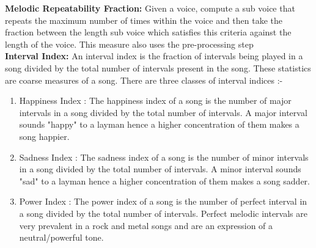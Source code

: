 \noindent \textbf{Melodic Repeatability Fraction: } Given a voice, compute a sub voice that repeats the maximum number of times within the voice and then take the fraction between the length sub voice which satisfies this criteria against the length of the voice. This measure also uses the pre-processing step \\

\noindent \textbf{Interval Index: } An interval index is the fraction of intervals being played in a song divided by the total number of intervals present in the song. These statistics are coarse measures of a song. There are three classes of interval indices :-

\begin{enumerate}
\item Happiness Index : The happiness index of a song is the number of major intervals in a song divided by the total number of intervals. A major interval sounds "happy" to a layman hence a higher concentration of them makes a song happier. 
\item Sadness Index : The sadness index of a song is the number of minor intervals in a song divided by the total number of intervals. A minor interval sounds "sad" to a layman hence a higher concentration of them makes a song sadder. 
\item Power Index : The power index of a song is the number of perfect interval in a song divided by the total number of intervals. Perfect melodic intervals are very prevalent in a rock and metal songs and are an expression of a neutral/powerful tone. 
\end{enumerate}